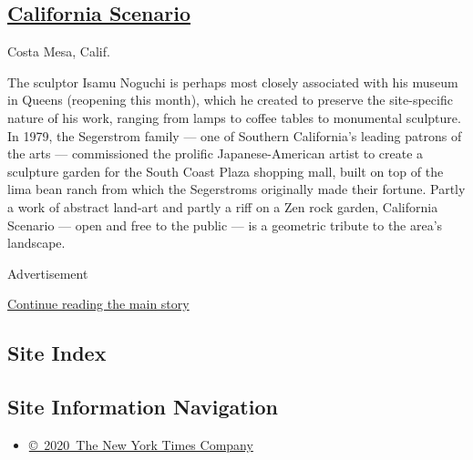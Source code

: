 \hypertarget{california-scenario}{%
\subsection{\texorpdfstring{\href{https://www.southcoastplaza.com/stories/2016/12/noguchi-garden/}{California
Scenario}}{California Scenario}}\label{california-scenario}}

Costa Mesa, Calif.

The sculptor Isamu Noguchi is perhaps most closely associated with his
museum in Queens (reopening this month), which he created to preserve
the site-specific nature of his work, ranging from lamps to coffee
tables to monumental sculpture. In 1979, the Segerstrom family --- one
of Southern California's leading patrons of the arts --- commissioned
the prolific Japanese-American artist to create a sculpture garden for
the South Coast Plaza shopping mall, built on top of the lima bean ranch
from which the Segerstroms originally made their fortune. Partly a work
of abstract land-art and partly a riff on a Zen rock garden, California
Scenario --- open and free to the public --- is a geometric tribute to
the area's landscape.

Advertisement

\protect\hyperlink{after-bottom}{Continue reading the main story}

\hypertarget{site-index}{%
\subsection{Site Index}\label{site-index}}

\hypertarget{site-information-navigation}{%
\subsection{Site Information
Navigation}\label{site-information-navigation}}

\begin{itemize}
\tightlist
\item
  \href{https://help.nytimes3xbfgragh.onion/hc/en-us/articles/115014792127-Copyright-notice}{©~2020~The
  New York Times Company}
\end{itemize}

